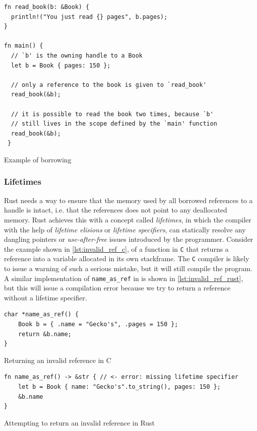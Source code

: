 \begin{listing}[tb]
\begin{verbatim}
fn read_book(b: &Book) {
  println!("You just read {} pages", b.pages);
}

fn main() {
  // `b' is the owning handle to a Book
  let b = Book { pages: 150 };

  // only a reference to the book is given to `read_book'
  read_book(&b);

  // it is possible to read the book two times, because `b'
  // still lives in the scope defined by the `main' function
  read_book(&b);
 }
\end{verbatim}
\caption{Example of borrowing}
\label{lst:borrowing_handle}
\end{listing}

\subsubsection{Lifetimes}
\label{ssec:lifetimes}

Rust needs a way to ensure that the memory used by all borrowed references to a handle is intact, i.e. that the references does not point to any deallocated memory.
Rust achieves this with a concept called \emph{lifetimes}, in which the compiler with the help of \emph{lifetime elisions} or \emph{lifetime specifiers}, can statically resolve any dangling pointers or \emph{use-after-free} issues introduced by the programmer.
Consider the example shown in \autoref{lst:invalid_ref_c}, of a function in \texttt{C} that returns a reference into a variable allocated in its own stackframe.
The \texttt{C} compiler is likely to issue a warning of such a serious mistake, but it will still compile the program.
A similar implementation of \texttt{name\_as\_ref} in \rust is shown in \autoref{lst:invalid_ref_rust}, but this will issue a compilation error because we try to return a reference without a lifetime specifier.

\begin{listing}[tb]
\begin{verbatim}
char *name_as_ref() {
    Book b = { .name = "Gecko's", .pages = 150 };
    return &b.name;
}
\end{verbatim}
\caption{Returning an invalid reference in C}
\label{lst:invalid_ref_c}
\end{listing}

\begin{listing}[tb]
\begin{verbatim}
fn name_as_ref() -> &str { // <- error: missing lifetime specifier
    let b = Book { name: "Gecko's".to_string(), pages: 150 };
    &b.name
}
\end{verbatim}
\caption{Attempting to return an invalid reference in Rust}
\label{lst:invalid_ref_rust}
\end{listing}

